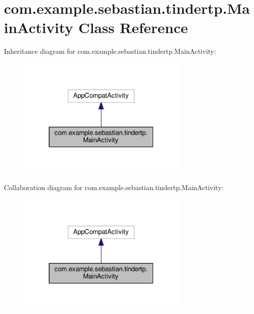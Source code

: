 \hypertarget{classcom_1_1example_1_1sebastian_1_1tindertp_1_1MainActivity}{}\section{com.\+example.\+sebastian.\+tindertp.\+Main\+Activity Class Reference}
\label{classcom_1_1example_1_1sebastian_1_1tindertp_1_1MainActivity}


Inheritance diagram for com.\+example.\+sebastian.\+tindertp.\+Main\+Activity\+:\nopagebreak
\begin{figure}[H]
\begin{center}
\leavevmode
\includegraphics[width=236pt]{classcom_1_1example_1_1sebastian_1_1tindertp_1_1MainActivity__inherit__graph}
\end{center}
\end{figure}


Collaboration diagram for com.\+example.\+sebastian.\+tindertp.\+Main\+Activity\+:\nopagebreak
\begin{figure}[H]
\begin{center}
\leavevmode
\includegraphics[width=236pt]{classcom_1_1example_1_1sebastian_1_1tindertp_1_1MainActivity__coll__graph}
\end{center}
\end{figure}
